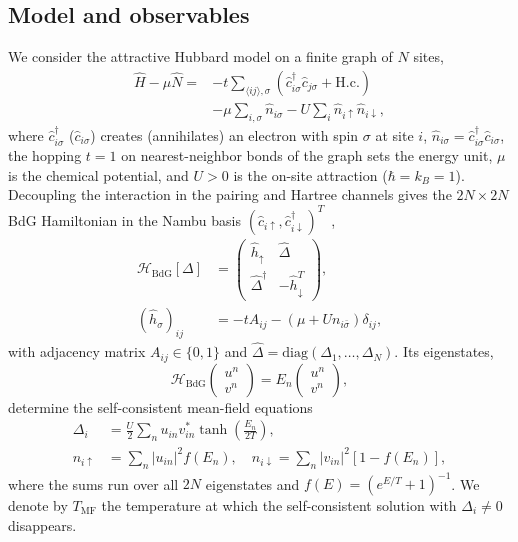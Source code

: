 \documentclass[aps,prb,twocolumn,superscriptaddress,floatfix]{revtex4-2}
\newcommand{\Tmf}{T_{\mathrm{MF}}}
\begin{document}
\subsection{Model and observables}

We consider the attractive Hubbard model on a finite graph of $N$ sites,
\begin{equation}
\begin{aligned}
\hat{H} - \mu\hat{N} ={}& -t\sum_{\langle ij\rangle,\sigma} \left(\hat{c}_{i\sigma}^\dagger \hat{c}_{j\sigma} + \mathrm{H.c.}\right) \\
& - \mu\sum_{i,\sigma} \hat{n}_{i\sigma} - U\sum_i \hat{n}_{i\uparrow}\hat{n}_{i\downarrow},
\end{aligned}
\label{eq:hubbard_main}
\end{equation}
where $\hat{c}_{i\sigma}^\dagger$ ($\hat{c}_{i\sigma}$) creates (annihilates)
an electron with spin $\sigma$ at site $i$,
$\hat{n}_{i\sigma} = \hat{c}_{i\sigma}^\dagger \hat{c}_{i\sigma}$, the hopping
$t = 1$ on nearest-neighbor bonds of the graph sets the energy unit, $\mu$ is
the chemical potential, and $U > 0$ is the on-site attraction
($\hbar = k_B = 1$). Decoupling the interaction in the pairing and Hartree
channels gives the $2N \times 2N$ BdG Hamiltonian in the Nambu basis
$(\hat{c}_{i\uparrow}, \hat{c}_{i\downarrow}^\dagger)^T$~\cite{dG66,MRR90,GRT98,GRT01},
\begin{equation}
\begin{aligned}
\mathcal{H}_{\mathrm{BdG}}[\Delta] &= \begin{pmatrix} \hat{h}_\uparrow & \hat{\Delta} \\ \hat{\Delta}^\dagger & -\hat{h}_\downarrow^T \end{pmatrix}, \\
(\hat{h}_\sigma)_{ij} &= -t A_{ij} - \left(\mu + U n_{i\bar{\sigma}}\right)\delta_{ij},
\end{aligned}
\label{eq:H_bdg_matrix}
\end{equation}
with adjacency matrix $A_{ij} \in \{0,1\}$ and
$\hat{\Delta} = \mathrm{diag}(\Delta_1, \dots, \Delta_N)$. Its eigenstates,
\begin{equation}
\mathcal{H}_{\mathrm{BdG}} \begin{pmatrix} u^n \\ v^n \end{pmatrix} = E_n \begin{pmatrix} u^n \\ v^n \end{pmatrix},
\label{eq:bdg_eigen}
\end{equation}
determine the self-consistent mean-field equations
\begin{align}
\Delta_i &= \frac{U}{2}\sum_n u_{in} v_{in}^* \tanh\left(\frac{E_n}{2T}\right), \label{eq:gap_scf} \\
n_{i\uparrow} &= \sum_n |u_{in}|^2 f(E_n), \quad n_{i\downarrow} = \sum_n |v_{in}|^2 \left[1 - f(E_n)\right], \label{eq:density_scf}
\end{align}
where the sums run over all $2N$ eigenstates and $f(E) = (e^{E/T} + 1)^{-1}$.
We denote by $\Tmf$ the temperature at which the self-consistent solution with
$\Delta_i \neq 0$ disappears.
\end{document}
